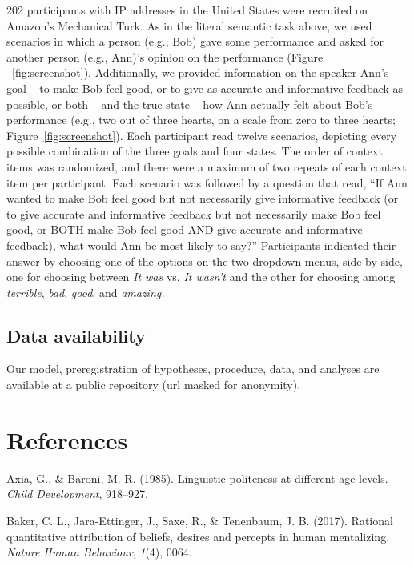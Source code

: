 \documentclass[floatsintext,mask,man]{apa6}
\theoremstyle{definition}
\theoremstyle{definition}
\theoremstyle{definition}
\theoremstyle{remark}
\begin{document}
202 participants with IP addresses in the United States were recruited
on Amazon's Mechanical Turk. As in the literal semantic task above, we
used scenarios in which a person (e.g., Bob) gave some performance and
asked for another person (e.g., Ann)'s opinion on the performance
(Figure ~\ref{fig:screenshot}). Additionally, we provided information on
the speaker Ann's goal -- to make Bob feel good, or to give as accurate
and informative feedback as possible, or both -- and the true state --
how Ann actually felt about Bob's performance (e.g., two out of three
hearts, on a scale from zero to three hearts;
Figure~\ref{fig:screenshot}). Each participant read twelve scenarios,
depicting every possible combination of the three goals and four states.
The order of context items was randomized, and there were a maximum of
two repeats of each context item per participant. Each scenario was
followed by a question that read, \enquote{If Ann wanted to make Bob
feel good but not necessarily give informative feedback (or to give
accurate and informative feedback but not necessarily make Bob feel
good, or BOTH make Bob feel good AND give accurate and informative
feedback), what would Ann be most likely to say?} Participants indicated
their answer by choosing one of the options on the two dropdown menus,
side-by-side, one for choosing between \emph{It was} vs. \emph{It
wasn't} and the other for choosing among \emph{terrible}, \emph{bad},
\emph{good}, and \emph{amazing.}

\subsection{Data availability}\label{data-availability}

Our model, preregistration of hypotheses, procedure, data, and analyses
are available at a public repository (url masked for anonymity).

\newpage

\section{References}\label{references}

\setlength{\parindent}{-0.5in} \setlength{\leftskip}{0.5in}

\hypertarget{refs}{}
\hypertarget{ref-axia1985}{}
Axia, G., \& Baroni, M. R. (1985). Linguistic politeness at different
age levels. \emph{Child Development}, 918--927.

\hypertarget{ref-baker2017rational}{}
Baker, C. L., Jara-Ettinger, J., Saxe, R., \& Tenenbaum, J. B. (2017).
Rational quantitative attribution of beliefs, desires and percepts in
human mentalizing. \emph{Nature Human Behaviour}, \emph{1}(4), 0064.
\end{document}

